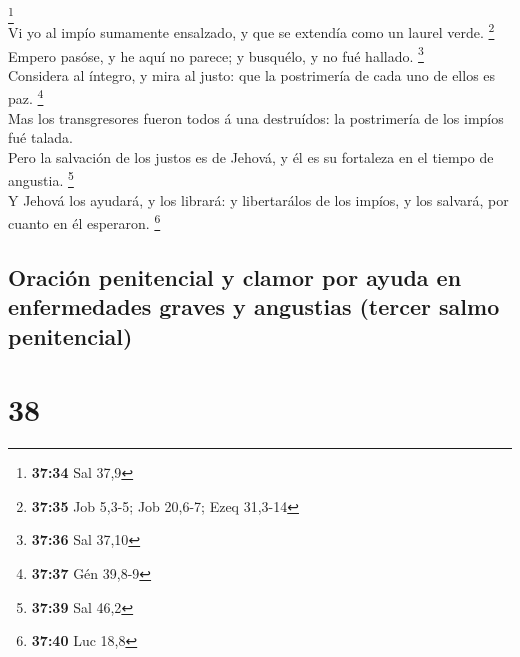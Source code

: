 \footnote{\textbf{37:34} Sal 37,9}\\
 Vi yo al impío sumamente ensalzado, y que se extendía como
un laurel verde. \footnote{\textbf{37:35} Job 5,3-5; Job 20,6-7; Ezeq
  31,3-14}\\
 Empero pasóse, y he aquí no parece; y busquélo, y no fué
hallado. \footnote{\textbf{37:36} Sal 37,10}\\
 Considera al íntegro, y mira al justo: que la postrimería
de cada uno de ellos es paz. \footnote{\textbf{37:37} Gén 39,8-9}\\
 Mas los transgresores fueron todos á una destruídos: la
postrimería de los impíos fué talada.\\
 Pero la salvación de los justos es de Jehová, y él es su
fortaleza en el tiempo de angustia. \footnote{\textbf{37:39} Sal 46,2}\\
 Y Jehová los ayudará, y los librará: y libertarálos de los
impíos, y los salvará, por cuanto en él esperaron. \footnote{\textbf{37:40}
  Luc 18,8}

\hypertarget{oraciuxf3n-penitencial-y-clamor-por-ayuda-en-enfermedades-graves-y-angustias-tercer-salmo-penitencial}{%
\subsection{Oración penitencial y clamor por ayuda en enfermedades
graves y angustias (tercer salmo
penitencial)}\label{oraciuxf3n-penitencial-y-clamor-por-ayuda-en-enfermedades-graves-y-angustias-tercer-salmo-penitencial}}

\hypertarget{section-37}{%
\section{38}\label{section-37}}

